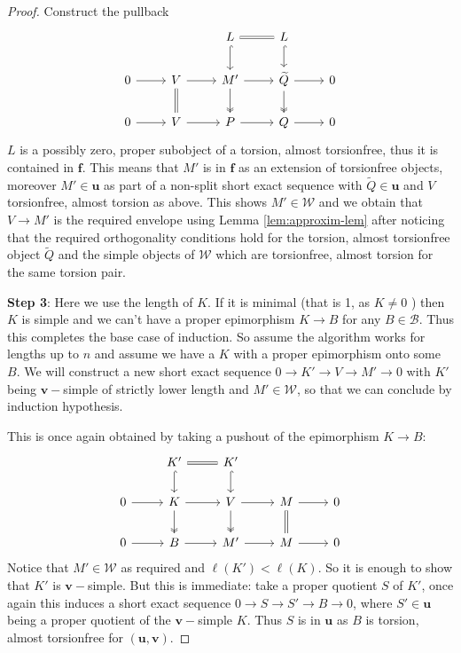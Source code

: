 \documentclass[10pt,a4paper]{amsart}
\newcommand{\B}{\mathcal B}
\newcommand{\tpair}[2]{(\mathbf{#1}, \mathbf{#2})  }
\begin{document}
\begin{proof}
Construct the pullback
\[
\begin{tikzcd}
& & L \ar[r, equals] \ar[d, hook] & L \ar[d, hook] \\
0 \ar[r] & V  \ar[d, equals] \ar[r] & M' \ar[d, two heads] \ar[r] & \widetilde{Q} \ar[r] \ar[d, two heads] & 0 \\
0 \ar[r] & V  \ar[r] & P \ar[r] & Q \ar[r] & 0
\end{tikzcd}
\]
\( L \) is a possibly zero, proper subobject of a torsion, almost torsionfree, thus it is contained in \( \mathbf{f} \). This means that \( M' \) is in \( \mathbf{f} \) as an extension of torsionfree objects, moreover \( M' \in \mathbf{u} \) as part of a non-split short exact sequence with \( \widetilde{Q} \in \mathbf{u} \) and \( V \) torsionfree, almost  torsion as above. This shows \( M' \in \mathcal{W} \) and we obtain that \( V \to M' \) is the required envelope using Lemma \ref{lem:approxim-lem} after noticing that the required orthogonality conditions hold for the torsion, almost torsionfree object \( \widetilde{Q} \) and the simple objects of \( \mathcal{W} \) which are torsionfree, almost torsion for the same torsion pair. 

\noindent \textbf{Step 3}: Here we use the length of \( K \). If it is minimal (that is 1, as \( K \ne 0 \) ) then \( K \) is simple and we can't have a proper epimorphism \( K \to B \) for any \( B \in \B \). Thus this completes the base case of induction. So assume the algorithm works for lengths up to \( n \) and assume we have a \( K \) with a proper epimorphism onto some \( B \). We will construct a new short exact sequence \( 0 \to K' \to V \to M' \to 0 \) with \( K' \) being \( \mathbf{v}-\)simple of strictly lower length and \(M' \in \mathcal{W} \), so that we can conclude by induction hypothesis.  

This is once again obtained by taking a pushout of the epimorphism \( K \to B \):
\[
\begin{tikzcd}
 & K' \ar[r, equals] \ar[d, hook] & K' \ar[d, hook] \\
0 \ar[r] & K \ar[d, two heads] \ar[r] & V \ar[d, two heads] \ar[r] & M \ar[r] \ar[d, equals] & 0 \\
0 \ar[r] & B  \ar[r] & M' \ar[r] & M \ar[r] & 0
\end{tikzcd}
\] 
Notice that \( M' \in \mathcal{W} \) as required and \( \ell(K') < \ell(K) \). So it is enough to show that \( K' \) is \( \mathbf{v}-\)simple. But this is immediate: take a proper quotient \( S \) of \( K' \), once again this induces a short exact sequence \( 0 \to S \to S' \to B \to 0 \), where \( S' \in \mathbf{u} \) being a proper quotient of the \( \mathbf{v}-\)simple \( K \). Thus \( S \) is in \( \mathbf{u} \) as \( B \) is torsion, almost torsionfree for \( \tpair{u}{v} \). 
\end{proof}
\end{document}
